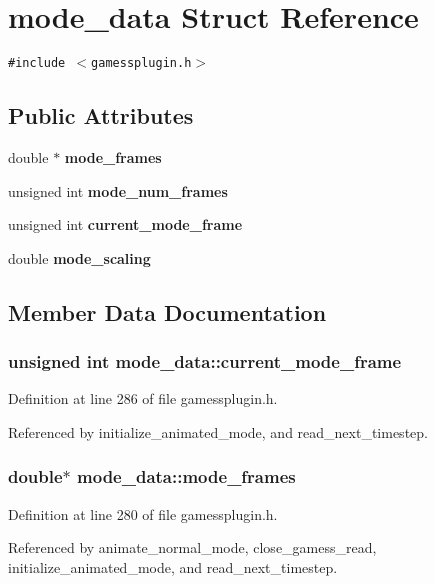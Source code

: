 \section{mode\_\-data  Struct Reference}
\label{structmode__data}
{\tt \#include $<$gamessplugin.h$>$}

\subsection*{Public Attributes}
\begin{CompactItemize}
\item 
double $\ast$ {\bf mode\_\-frames}
\item 
unsigned int {\bf mode\_\-num\_\-frames}
\item 
unsigned int {\bf current\_\-mode\_\-frame}
\item 
double {\bf mode\_\-scaling}
\end{CompactItemize}


\subsection{Member Data Documentation}
\subsubsection{\setlength{\rightskip}{0pt plus 5cm}unsigned int mode\_\-data::current\_\-mode\_\-frame}\label{structmode__data_m2}




Definition at line 286 of file gamessplugin.h.

Referenced by initialize\_\-animated\_\-mode, and read\_\-next\_\-timestep.
\subsubsection{\setlength{\rightskip}{0pt plus 5cm}double$\ast$ mode\_\-data::mode\_\-frames}\label{structmode__data_m0}




Definition at line 280 of file gamessplugin.h.

Referenced by animate\_\-normal\_\-mode, close\_\-gamess\_\-read, initialize\_\-animated\_\-mode, and read\_\-next\_\-timestep.
